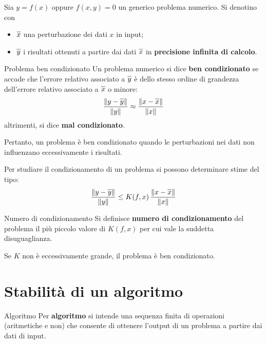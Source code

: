 Sia $y=f(x)$ oppure $f(x,y)=0$ un generico problema numerico. Si denotino con
\begin{itemize}
    \item $\overline{x\vphantom{\rule{0pt}{1.2ex}}}$ una perturbazione dei dati $x$ in input;
    \item $\overline{y\vphantom{\rule{0pt}{1.2ex}}}$ i risultati ottenuti a partire dai dati
    $\overline{x\vphantom{\rule{0pt}{1.2ex}}}$ in \textbf{precisione infinita di calcolo}.
\end{itemize}

\begin{definition}{Problema ben condizionato}
    Un problema numerico si dice \textbf{ben condizionato} se accade che l'errore relativo associato
    a $\overline{y\vphantom{\rule{0pt}{1.2ex}}}$ è dello stesso ordine di grandezza dell'errore relativo
    associato a $\overline{x\vphantom{\rule{0pt}{1.2ex}}}$ o minore:
    \[\frac{\|y-\overline{y\vphantom{\rule{0pt}{1.2ex}}}\|}{\|y\|}\approx
    \frac{\|x-\overline{x\vphantom{\rule{0pt}{1.2ex}}}\|}{\|x\|}\]
    altrimenti, si dice \textbf{mal condizionato}.
\end{definition}

Pertanto, un problema è ben condizionato quando le perturbazioni nei dati non influenzano
eccessivamente i risultati.

Per studiare il condizionamento di un problema si possono determinare stime del tipo:
\[\frac{\|y-\overline{y\vphantom{\rule{0pt}{1.2ex}}}\|}{\|y\|}\leq K(f,x)\,
\frac{\|x-\overline{x\vphantom{\rule{0pt}{1.2ex}}}\|}{\|x\|}\]
\begin{definition}{Numero di condizionamento}
    Si definisce \textbf{numero di condizionamento} del problema il più piccolo valore di $K(f,x)$
    per cui vale la suddetta disuguaglianza.
\end{definition}
Se $K$ non è eccessivamente grande, il problema è ben condizionato.
\newpage

\section{Stabilità di un algoritmo}

\begin{definition}{Algoritmo}
    Per \textbf{algoritmo} si intende una sequenza finita di operazioni (aritmetiche e non) che
    consente di ottenere l'output di un problema a partire dai dati di input.
\end{definition}

